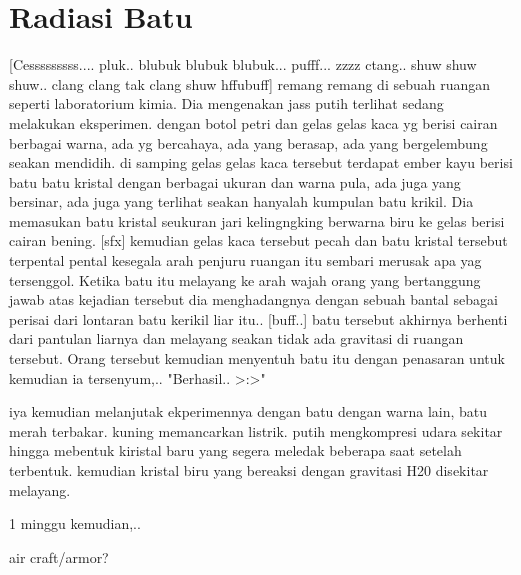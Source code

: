 \chapter{Radiasi Batu}

[Cesssssssss.... pluk.. blubuk blubuk blubuk... pufff... zzzz ctang.. shuw shuw shuw.. clang clang tak clang shuw hffubuff] 
remang remang di sebuah ruangan seperti laboratorium kimia. 
Dia mengenakan jass putih terlihat sedang melakukan eksperimen. 
dengan botol petri dan gelas gelas kaca yg berisi cairan berbagai warna, ada yg bercahaya, ada yang berasap, ada yang bergelembung seakan mendidih. 
di samping gelas gelas kaca tersebut terdapat ember kayu berisi batu batu kristal dengan berbagai ukuran dan warna pula, ada juga yang bersinar, ada juga yang terlihat seakan hanyalah kumpulan batu krikil. 
Dia memasukan batu kristal seukuran jari kelingngking berwarna biru ke gelas berisi cairan bening. 
[sfx] 
kemudian gelas kaca tersebut pecah dan batu kristal tersebut terpental pental kesegala arah penjuru ruangan itu sembari merusak apa yag tersenggol. 
Ketika batu itu melayang ke arah wajah orang yang bertanggung jawab atas kejadian tersebut dia menghadangnya dengan sebuah bantal sebagai perisai dari lontaran batu kerikil liar itu.. 
[buff..]
batu tersebut akhirnya berhenti dari pantulan liarnya dan melayang seakan tidak ada gravitasi di ruangan tersebut. 
Orang tersebut kemudian menyentuh batu itu dengan penasaran untuk kemudian ia tersenyum,.. 
"Berhasil.. >:>"

iya kemudian melanjutak ekperimennya dengan batu dengan warna lain, batu merah terbakar. kuning memancarkan listrik. putih mengkompresi udara sekitar hingga mebentuk kiristal baru yang segera meledak beberapa saat setelah terbentuk. kemudian kristal biru yang bereaksi dengan gravitasi H20 disekitar melayang.

1 minggu kemudian,..

air craft/armor?